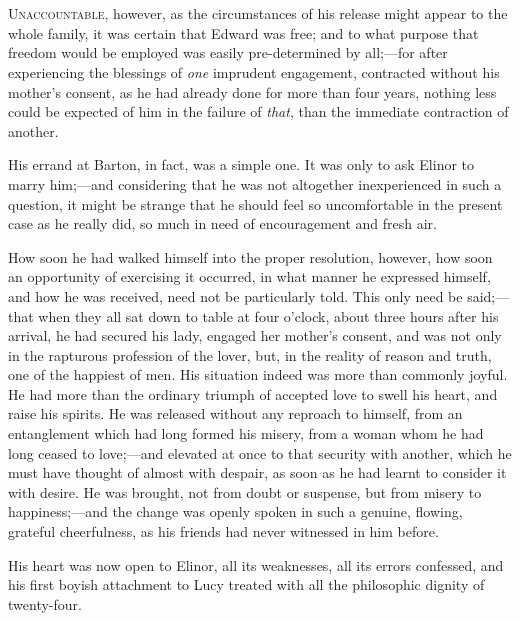\chapter[Chapter \thechapter]{}
\lettrine[lines=4,lraise=0.3]{U}{naccountable}, however, as the circumstances of his release might appear to the whole family, it was certain that Edward was free; and to what purpose that freedom would be employed was easily pre-determined by all;—for after experiencing the blessings of \textit{one} imprudent engagement, contracted without his mother’s consent, as he had already done for more than four years, nothing less could be expected of him in the failure of \textit{that}, than the immediate contraction of another.

His errand at Barton, in fact, was a simple one. It was only to ask Elinor to marry him;—and considering that he was not altogether inexperienced in such a question, it might be strange that he should feel so uncomfortable in the present case as he really did, so much in need of encouragement and fresh air.

How soon he had walked himself into the proper resolution, however, how soon an opportunity of exercising it occurred, in what manner he expressed himself, and how he was received, need not be particularly told. This only need be said;—that when they all sat down to table at four o’clock, about three hours after his arrival, he had secured his lady, engaged her mother’s consent, and was not only in the rapturous profession of the lover, but, in the reality of reason and truth, one of the happiest of men. His situation indeed was more than commonly joyful. He had more than the ordinary triumph of accepted love to swell his heart, and raise his spirits. He was released without any reproach to himself, from an entanglement which had long formed his misery, from a woman whom he had long ceased to love;—and elevated at once to that security with another, which he must have thought of almost with despair, as soon as he had learnt to consider it with desire. He was brought, not from doubt or suspense, but from misery to happiness;—and the change was openly spoken in such a genuine, flowing, grateful cheerfulness, as his friends had never witnessed in him before.

His heart was now open to Elinor, all its weaknesses, all its errors confessed, and his first boyish attachment to Lucy treated with all the philosophic dignity of twenty-four.

